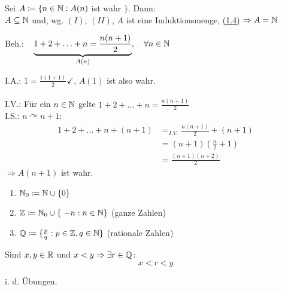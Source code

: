 \begin{beweis}
	Sei $A \coloneqq \{ n \in \mathbb{N} : A(n)$ ist wahr $\}$. Dann: \\
	$A \subseteq \mathbb{N}$ und, wg. $(I)$, $(II)$, $A$ ist eine Induktionsmenge, \hyperref[prop-1.4]{(1.4)} $\Rightarrow A = \mathbb{N}$
\end{beweis}


\begin{beispiel*}
	Beh.: ~ $\underbrace{1 + 2 + \dotsc + n = \frac{n (n + 1)}{2}}_{A(n)}, \quad \forall n \in \mathbb{N}$
\end{beispiel*}

\begin{beweis}[induktiv]
	I.A.: $1 = \frac{1 (1 + 1)}{2} \checkmark$, $A(1)$ ist also wahr. \\ \\
	I.V.: Für ein $n \in \mathbb{N}$ gelte $1 + 2 + \dotsc + n = \frac{n (n + 1)}{2}$ \\
	I.S.: $n \curvearrowright n + 1$: 
	\begin{align*}
		1 + 2 + \dotsc + n + (n + 1) & =_{I.V.}  \frac{n (n + 1)}{2} + (n + 1) \\
									 & = (n + 1) \left( \frac{n}{2} + 1 \right) \\
									 & = \frac{(n + 1)(n + 2)}{2}
	\end{align*}
	$\Rightarrow A(n + 1)$ ist wahr.
\end{beweis}


\begin{definition*}  
	\begin{enumerate}
		\item $\mathbb{N}_{0} \coloneqq \mathbb{N} \cup \{ 0 \}$
		\item $\Z \coloneqq \N_{0} \cup \{ - n : n \in \N \}$ (ganze Zahlen)
		\item $\mathbb{Q} \coloneqq \{ \frac{p}{q} : p \in \mathbb{Z}, q \in \mathbb{N} \}$ (rationale Zahlen)
	\end{enumerate}
\end{definition*}


\begin{satz}
	Sind $x, y \in \mathbb{R}$ und $x < y \Rightarrow \exists r \in \mathbb{Q}$:
	$$ x < r < y $$	
\end{satz}

\begin{beweis}
	i. d. Übungen.
\end{beweis}




